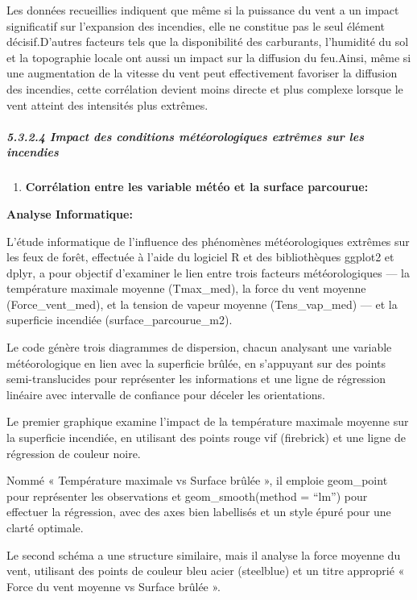 \documentclass[
]{article}
\providecommand{\tightlist}{%
  \setlength{\itemsep}{0pt}\setlength{\parskip}{0pt}}
\begin{document}
Les données recueillies indiquent que même si la puissance du vent a un
impact significatif sur l'expansion des incendies, elle ne constitue pas
le seul élément décisif.D'autres facteurs tels que la disponibilité des
carburants, l'humidité du sol et la topographie locale ont aussi un
impact sur la diffusion du feu.Ainsi, même si une augmentation de la
vitesse du vent peut effectivement favoriser la diffusion des incendies,
cette corrélation devient moins directe et plus complexe lorsque le vent
atteint des intensités plus extrêmes.

\subparagraph{5.3.2.4 Impact des conditions météorologiques extrêmes sur
les
incendies}\label{impact-des-conditions-muxe9tuxe9orologiques-extruxeames-sur-les-incendies}

\begin{enumerate}
\def\labelenumi{\arabic{enumi}.}
\tightlist
\item
  \textbf{Corrélation entre les variable météo et la surface parcourue:}
\end{enumerate}

\textbf{Analyse Informatique:}

L'étude informatique de l'influence des phénomènes météorologiques
extrêmes sur les feux de forêt, effectuée à l'aide du logiciel R et des
bibliothèques ggplot2 et dplyr, a pour objectif d'examiner le lien entre
trois facteurs météorologiques --- la température maximale moyenne
(Tmax\_med), la force du vent moyenne (Force\_vent\_med), et la tension
de vapeur moyenne (Tens\_vap\_med) --- et la superficie incendiée
(surface\_parcourue\_m2).

Le code génère trois diagrammes de dispersion, chacun analysant une
variable météorologique en lien avec la superficie brûlée, en s'appuyant
sur des points semi-translucides pour représenter les informations et
une ligne de régression linéaire avec intervalle de confiance pour
déceler les orientations.

Le premier graphique examine l'impact de la température maximale moyenne
sur la superficie incendiée, en utilisant des points rouge vif
(firebrick) et une ligne de régression de couleur noire.

Nommé « Température maximale vs Surface brûlée », il emploie geom\_point
pour représenter les observations et geom\_smooth(method = ``lm'') pour
effectuer la régression, avec des axes bien labellisés et un style épuré
pour une clarté optimale.

Le second schéma a une structure similaire, mais il analyse la force
moyenne du vent, utilisant des points de couleur bleu acier (steelblue)
et un titre approprié « Force du vent moyenne vs Surface brûlée ».
\end{document}
